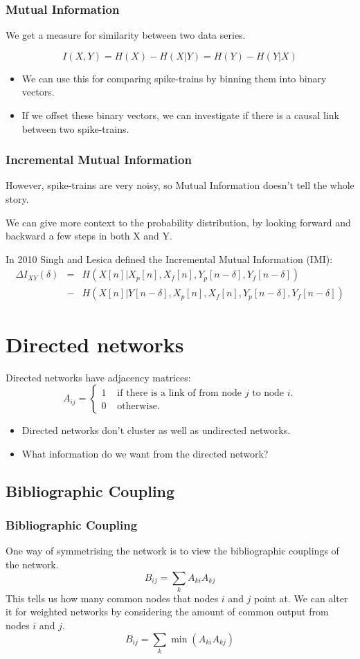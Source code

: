 \documentclass{beamer}
\begin{document}
\frame
{
\frametitle{Mutual Information}
We get a measure for similarity between two data series.

$$I(X,Y) = H(X) - H(X|Y) = H(Y) - H(Y|X)$$
\pause
\begin{itemize}
\item We can use this for comparing spike-trains by binning them into binary vectors.
\pause
\item If we offset these binary vectors, we can investigate if there is a causal link between two spike-trains.
\end{itemize}
}

\frame
{
\frametitle{Incremental Mutual Information}
However, spike-trains are very noisy, so Mutual Information doesn't tell the whole story.
\pause

We can give more context to the probability distribution, by looking forward and backward a few steps in both X and Y.
\pause

\bigskip
In 2010 Singh and Lesica defined the Incremental Mutual Information (IMI):
$$
\begin{array}{lll} \Delta I_{XY}(\delta) & = & H(X[n] | X_p[n], X_f[n], Y_p[n-\delta],Y_f[n-\delta]) \\
& - & H(X[n] | Y[n-\delta], X_p[n], X_f[n], Y_p[n-\delta],Y_f[n-\delta]) \end{array}
$$ 
}

\section{Directed networks}
\frame
{
Directed networks have adjacency matrices:
$$
A_{ij} = \left\{ \begin{array}{ll} 1 & \text{ if there is a link of from node $j$ to node $i$.}\\
0 & \text{ otherwise.}\end{array} \right.
$$
\pause
\begin{itemize}
\item<1-> Directed networks don't cluster as well as undirected networks. 
\item<2-> What information do we want from the directed network?
\end{itemize}
}
\subsection{Bibliographic Coupling}
\frame
{
\frametitle{Bibliographic Coupling}
One way of symmetrising the network is to view the bibliographic couplings of the network.
$$
B_{ij} = \sum_{k} A_{ki}A_{kj}
$$
\pause
This tells us how many common nodes that nodes $i$ and $j$ point at.
\pause
We can alter it for weighted networks by considering the amount of common output from nodes $i$ and $j$.
\pause
$$
B_{ij} = \sum_k \min (A_{ki}A_{kj})
$$

}
\end{document}
